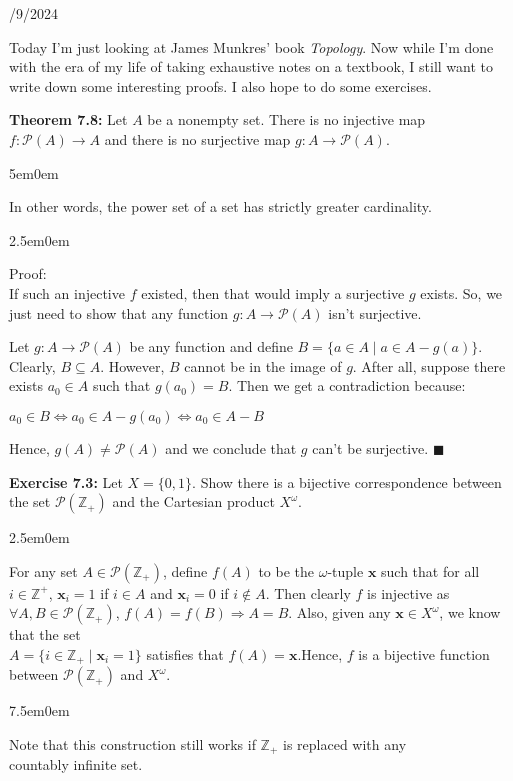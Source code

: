 \documentclass{book}
\newcommand{\hOne}{%
   \color{Black}%
   \fontsize{14}{16}\selectfont%
}
\newcommand{\hTwo}{%
\color{Black}%
   \fontsize{13}{15}\selectfont%
}
\newcommand{\myComment}{%
   \color{RawerSienna}%
   \fontsize{12}{14}\selectfont%
}
\newcommand{\exOne}{%
   \color{Purple}%
   \fontsize{14}{16}\selectfont%
}
\newcommand{\exTwo}{%
\color{Purple}%
   \fontsize{13}{15}\selectfont%
}
\newenvironment{myIndent}{%
   \begin{adjustwidth}{2.5em}{0em}%
}{%
   \end{adjustwidth}%
}
\newenvironment{myDindent}{%
   \begin{adjustwidth}{5em}{0em}%
}{%
   \end{adjustwidth}%
}
\newenvironment{myTindent}{%
   \begin{adjustwidth}{7.5em}{0em}%
}{%
   \end{adjustwidth}%
}
\newcommand{\blab}[1]{\textbf{#1}}
\newcommand{\retTwo}{\hfill\bigbreak}
\newcommand{\dispDate}[1]{{
   \color{Black}%
   \fontsize{20}{18}\selectfont%
   #1\retTwo
}}
\begin{document}
   \dispDate{9/9/2024}

   \hOne
   Today I'm just looking at James Munkres' book \textit{Topology}. Now while I'm done with the era of my life of taking exhaustive notes on a textbook, I still want to write down some interesting proofs. I also hope to do some exercises.\retTwo

   \blab{Theorem 7.8:} Let $A$ be a nonempty set. There is no injective map $f: \mathcal{P}(A) \longrightarrow A$ and there is no surjective map $g: A \longrightarrow \mathcal{P}(A)$.

   \begin{myDindent}\myComment
      In other words, the power set of a set has strictly greater cardinality.\retTwo
   \end{myDindent}

   
   \begin{myIndent}\hTwo
      Proof:\\
      If such an injective $f$ existed, then that would imply a surjective $g$ exists. So, we just need to show that any function $g: A \longrightarrow \mathcal{P}(A)$ isn't surjective.\retTwo

      Let $g: A \longrightarrow \mathcal{P}(A)$ be any function and define $B = \{a \in A \mid a \in A - g(a)\}$.\\ Clearly, $B \subseteq A$. However, $B$ cannot be in the image of $g$. After all, suppose there exists $a_0 \in A$ such that $g(a_0) = B$. Then we get a contradiction because:

      {\centering $a_0 \in B \Longleftrightarrow a_0 \in A - g(a_0) \Longleftrightarrow a_0 \in A - B$ \retTwo\par}

      Hence, $g(A) \neq \mathcal{P}(A)$ and we conclude that $g$ can't be surjective. $\blacksquare$\retTwo\retTwo
   \end{myIndent}

   \exOne
   \blab{Exercise 7.3:} Let $X= \{0, 1\}$. Show there is a bijective correspondence between the set $\mathcal{P}(\mathbb{Z}_+)$ and the Cartesian product $X^\omega$.\retTwo

   
   \begin{myIndent}\exTwo
      For any set $A \in \mathcal{P}(\mathbb{Z}_+)$, define $f(A)$ to be the $\omega$-tuple $\mathbf{x}$ such that for all $i \in \mathbb{Z}^+$, $\mathbf{x}_i = 1$ if $i \in A$ and $\mathbf{x}_i = 0$ if $i \notin A$. Then clearly $f$ is injective as $\forall A, B \in \mathcal{P}(\mathbb{Z}_+)$, $f(A) = f(B) \Longrightarrow A = B$. Also, given any $\mathbf{x} \in X^\omega$, we know that the set\\ $A = \{i \in \mathbb{Z}_+ \mid \mathbf{x}_i = 1\}$ satisfies that $f(A) = \mathbf{x}$.\retTwo Hence, $f$ is a bijective function between $\mathcal{P}(\mathbb{Z}_+)$ and $X^\omega$.
      \begin{myTindent}\myComment
         Note that this construction still works if $\mathbb{Z}_+$ is replaced with any\\ countably infinite set.\retTwo\retTwo
      \end{myTindent}
   \end{myIndent}
\end{document}
